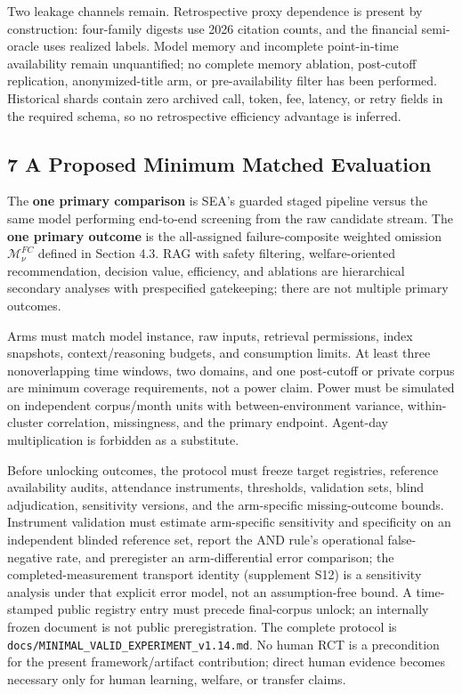 \documentclass[
  11pt]{article}
\begin{document}
Two leakage channels remain. Retrospective proxy dependence is present
by construction: four-family digests use 2026 citation counts, and the
financial semi-oracle uses realized labels. Model memory and incomplete
point-in-time availability remain unquantified; no complete memory
ablation, post-cutoff replication, anonymized-title arm, or
pre-availability filter has been performed. Historical shards contain
zero archived call, token, fee, latency, or retry fields in the required
schema, so no retrospective efficiency advantage is inferred.

\subsection{7 A Proposed Minimum Matched
Evaluation}\label{a-proposed-minimum-matched-evaluation}

The \textbf{one primary comparison} is SEA's guarded staged pipeline
versus the same model performing end-to-end screening from the raw
candidate stream. The \textbf{one primary outcome} is the all-assigned
failure-composite weighted omission \(\mathcal M^{FC}_{\nu}\) defined in
Section 4.3. RAG with safety filtering, welfare-oriented recommendation,
decision value, efficiency, and ablations are hierarchical secondary
analyses with prespecified gatekeeping; there are not multiple primary
outcomes.

Arms must match model instance, raw inputs, retrieval permissions, index
snapshots, context/reasoning budgets, and consumption limits. At least
three nonoverlapping time windows, two domains, and one post-cutoff or
private corpus are minimum coverage requirements, not a power claim.
Power must be simulated on independent corpus/month units with
between-environment variance, within-cluster correlation, missingness,
and the primary endpoint. Agent-day multiplication is forbidden as a
substitute.

Before unlocking outcomes, the protocol must freeze target registries,
reference availability audits, attendance instruments, thresholds,
validation sets, blind adjudication, sensitivity versions, and the
arm-specific missing-outcome bounds. Instrument validation must estimate
arm-specific sensitivity and specificity on an independent blinded
reference set, report the AND rule's operational false-negative rate,
and preregister an arm-differential error comparison; the
completed-measurement transport identity (supplement S12) is a
sensitivity analysis under that explicit error model, not an
assumption-free bound. A time-stamped public registry entry must precede
final-corpus unlock; an internally frozen document is not public
preregistration. The complete protocol is
\texttt{docs/MINIMAL\_VALID\_EXPERIMENT\_v1.14.md}. No human RCT is a
precondition for the present framework/artifact contribution; direct
human evidence becomes necessary only for human learning, welfare, or
transfer claims.
\end{document}

